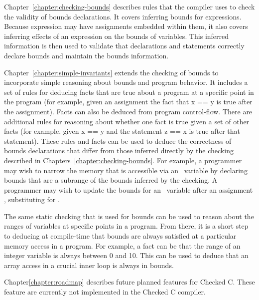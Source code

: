 Chapter~\ref{chapter:checking-bounds} describes rules that the compiler uses to check the validity
of bounds declarations. It covers inferring bounds for expressions.
Because expression may have assignments embedded within them, it also
covers inferring effects of an expression on the bounds of variables.
This inferred information is then used to validate that declarations and
statements correctly declare bounds and maintain the bounds information.

Chapter~\ref{chapter:simple-invariants}
extends the checking of bounds to incorporate simple
reasoning about bounds and program behavior. It includes a set of rules
for deducing facts that are true about a program at a specific point in
the program (for example, given an assignment  the fact
that x == y is true after the assignment). Facts can also be deduced
from program control-flow. There are additional rules for reasoning
about whether one fact is true given a set of other facts (for example,
given x == y and the statement  z == x is true after that
statement). These rules and facts can be used to deduce the correctness
of bounds declarations that differ from those inferred directly by the
checking described in Chapters~\ref{chapter:checking-bounds}. For example,
a programmer may wish to narrow the memory that is accessible via an
\arrayptr\ variable by declaring bounds that are a subrange of
the bounds inferred by the checking. A programmer may wish to update the
bounds for an \arrayptr\ variable after an assignment , substituting
 for .

The same static checking that is used for bounds can be used to reason
about the ranges of variables at specific points in a program. From
there, it is a short step to deducing at compile-time that bounds are
always satisfied at a particular memory access in a program. For
example, a fact can be that the range of an integer variable 
is always between 0 and 10. This can be used to deduce that an array
access in a crucial inner loop is always in bounds.

Chapter\ref{chapter:roadmap} describes future planned features for Checked C.
These feature are currently not implemented in the Checked C compiler.


